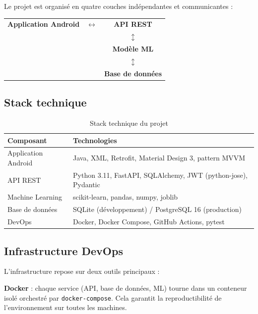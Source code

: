 \documentclass[12pt, a4paper]{article}
\begin{document}
Le projet est organisé en quatre couches indépendantes et communicantes :

\begin{center}
\begin{tabular}{ccc}
    \textbf{Application Android} & $\longleftrightarrow$ & \textbf{API REST} \\
    & & $\updownarrow$ \\
    & & \textbf{Modèle ML} \\
    & & $\updownarrow$ \\
    & & \textbf{Base de données} \\
\end{tabular}
\end{center}

\vspace{0.5cm}

\subsection{Stack technique}

\begin{table}[H]
\centering
\begin{tabularx}{\textwidth}{lX}
\toprule
\textbf{Composant} & \textbf{Technologies} \\
\midrule
Application Android & Java, XML, Retrofit, Material Design 3, pattern MVVM \\
API REST            & Python 3.11, FastAPI, SQLAlchemy, JWT (python-jose), Pydantic \\
Machine Learning    & scikit-learn, pandas, numpy, joblib \\
Base de données     & SQLite (développement) / PostgreSQL 16 (production) \\
DevOps              & Docker, Docker Compose, GitHub Actions, pytest \\
\bottomrule
\end{tabularx}
\caption{Stack technique du projet}
\end{table}

\subsection{Infrastructure DevOps}

L'infrastructure repose sur deux outils principaux :

\textbf{Docker} : chaque service (API, base de données, ML) tourne dans un conteneur isolé orchestré par \texttt{docker-compose}. Cela garantit la reproductibilité de l'environnement sur toutes les machines.
\end{document}
